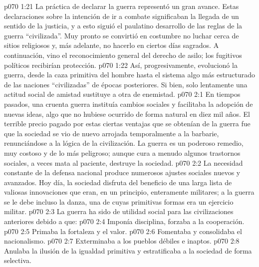 \vs p070 1:21 La práctica de declarar la guerra representó un gran avance. Estas declaraciones sobre la intención de ir a combate significaban la llegada de un sentido de la justicia, y a esto siguió el paulatino desarrollo de las reglas de la guerra “civilizada”. Muy pronto se convirtió en costumbre no luchar cerca de sitios religiosos y, más adelante, no hacerlo en ciertos días sagrados. A continuación, vino el reconocimiento general del derecho de asilo; los fugitivos políticos recibirían protección.
\vs p070 1:22 Así, progresivamente, evolucionó la guerra, desde la caza primitiva del hombre hasta el sistema algo más estructurado de las naciones “civilizadas” de épocas posteriores. Si bien, solo lentamente una actitud social de amistad sustituye a otra de enemistad.
\vs p070 2:1 En tiempos pasados, una cruenta guerra instituía cambios sociales y facilitaba la adopción de nuevas ideas, algo que no hubiese ocurrido de forma natural en diez mil años. El terrible precio pagado por estas ciertas ventajas que se obtenían de la guerra fue que la sociedad se vio de nuevo arrojada temporalmente a la barbarie, renunciándose a la lógica de la civilización. La guerra es un poderoso remedio, muy costoso y de lo más peligroso; aunque cura a menudo algunos trastornos sociales, a veces mata al paciente, destruye la sociedad.
\vs p070 2:2 La necesidad constante de la defensa nacional produce numerosos ajustes sociales nuevos y avanzados. Hoy día, la sociedad disfruta del beneficio de una larga lista de valiosas innovaciones que eran, en un principio, enteramente militares; a la guerra se le debe incluso la danza, una de cuyas primitivas formas era un ejercicio militar.
\vs p070 2:3 \pc La guerra ha sido de utilidad social para las civilizaciones anteriores debido a que:
\vs p070 2:4 Imponía disciplina, forzaba a la cooperación.
\vs p070 2:5 Primaba la fortaleza y el valor.
\vs p070 2:6 Fomentaba y consolidaba el nacionalismo.
\vs p070 2:7 Exterminaba a los pueblos débiles e inaptos.
\vs p070 2:8 Anulaba la ilusión de la igualdad primitiva y estratificaba a la sociedad de forma selectiva.

